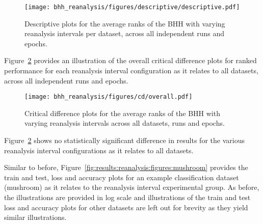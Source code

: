 \begin{figure}[htb]
	\centering
	\texttt{[image: bhh\_reanalysis/figures/descriptive/descriptive.pdf]}
	\caption{Descriptive plots for the average ranks of the \acs{BHH} with varying reanalysis intervals per dataset, across all independent runs and epochs.}
	\label{fig:results:reanalysis:descriptive:descriptive}
\end{figure}

Figure~\ref{fig:results:reanalysis:descriptive:cd} provides an illustration of the overall critical difference plots for ranked performance for each reanalysis interval configuration as it relates to all datasets, across all independent runs and epochs.

\begin{figure}[htb]
	\centering
	\texttt{[image: bhh\_reanalysis/figures/cd/overall.pdf]}
	\caption{Critical difference plots for the average ranks of the \acs{BHH} with varying reanalysis intervals across all datasets, runs and epochs.}
	\label{fig:results:reanalysis:descriptive:cd}
\end{figure}

Figure~\ref{fig:results:reanalysis:descriptive:cd} shows no statistically significant difference in results for the various reanalysis interval configurations as it relates to all datasets.

Similar to before, Figure~\ref{fig:results:reanalysis:figures:mushroom} provides the train and test, loss and accuracy plots for an example classification dataset (mushroom) as it relates to the reanalysis interval experimental group. As before, the illustrations are provided in log scale and illustrations of the train and test loss and accuracy plots for other datasets are left out for brevity as they yield similar illustrations.

